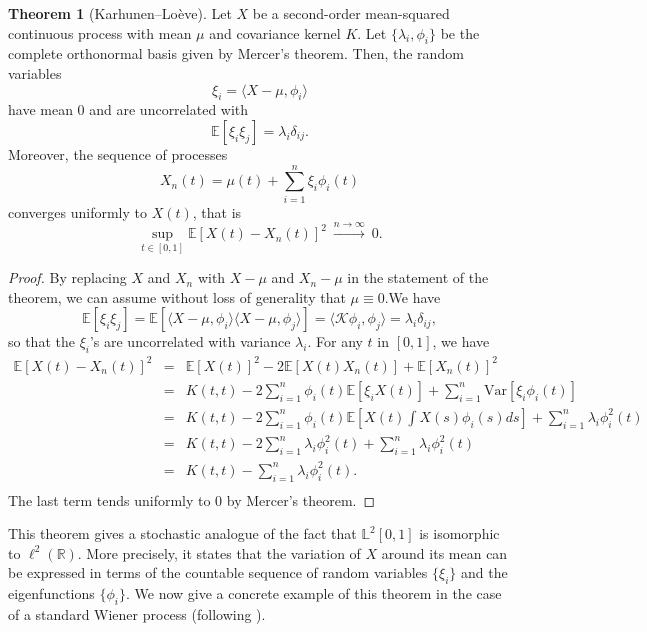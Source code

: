 \documentclass[10pt, a4paper]{report}
\newcommand{\E}[0]{\mathbb{E}}
\newcommand{\Ll}[0]{\mathbb{L}}
\newcommand{\R}[0]{\mathbb{R}}
\newcommand{\K}[0]{\mathcal{K}}
\theoremstyle{definition}
\newtheorem{theorem}{Theorem}
\theoremstyle{remark}
\begin{document}
\begin{theorem}[Karhunen–Loève]
	Let $X$ be a second-order mean-squared continuous process with mean $\mu$ and covariance kernel $K$. Let $\{\lambda_i,\phi_i\}$ be the complete orthonormal basis given by Mercer's theorem. Then, the random variables
	$$\xi_i = \langle X-\mu, \phi_i\rangle$$
	have mean 0 and are uncorrelated with 
	$$\E[\xi_i\xi_j]=\lambda_i \delta_{ij}.$$
	Moreover, the sequence of processes 
	$$X_n(t) = \mu(t) + \sum_{i=1}^{n} \xi_i \phi_i(t)$$
	converges uniformly to $X(t)$, that is 
	$$\sup_{t\in [0,1]} \E\left[X(t)-X_n(t)\right]^2 \  \stackrel{n\to \infty}{\longrightarrow} \ 0.$$
	\begin{proof}
		By replacing $X$ and $X_n$ with $X-\mu$ and $X_n-\mu$ in the statement of the theorem, we can assume without loss of generality that $\mu \equiv 0$.We have 
		$$\E[\xi_i\xi_j]= \E[\langle X-\mu, \phi_i\rangle\langle X-\mu, \phi_j\rangle] = \langle \K \phi_i, \phi_j\rangle = \lambda_i \delta_{ij},$$
		so that the $\xi_i$'s are uncorrelated with variance $\lambda_i$. For any $t$ in $[0,1]$, we have 
		\begin{eqnarray*}
			\E\left[X(t)-X_n(t)\right]^2 & = & \E\left[X(t)\right]^2 - 2\E\left[X(t)X_n(t)\right] + \E\left[X_n(t)\right]^2 \\
			& = & K(t,t)- 2\sum_{i=1}^{n}\phi_i(t)\E[\xi_i X(t)] + \sum_{i=1}^{n} \mathrm{Var}[\xi_i \phi_i(t)]\\
			& = & K(t,t) - 2\sum_{i=1}^{n}\phi_i(t) \E\left[X(t)\int X(s)\phi_i(s)ds\right] + \sum_{i=1}^{n}\lambda_i \phi_i^2(t) \\
			& = & K(t,t) - 2\sum_{i=1}^{n}\lambda_i\phi_i^2(t)  + \sum_{i=1}^{n}\lambda_i \phi_i^2(t)\\
			& = & K(t,t) - \sum_{i=1}^{n}\lambda_i\phi_i^2(t).\\
		\end{eqnarray*}
		The last term tends uniformly to 0 by Mercer's theorem. 
	\end{proof}
\end{theorem}
This theorem gives a stochastic analogue of the fact that $\Ll^2[0,1]$ is isomorphic to $\ell^2(\R)$. More precisely, it states that the variation of $X$ around its mean can be expressed in terms of the countable sequence of random variables $\{\xi_i\}$ and the eigenfunctions $\{\phi_i\}$. We now give a concrete example of this theorem in the case of a standard Wiener process (following \cite[Example 4.6.3]{found}).
\end{document}
